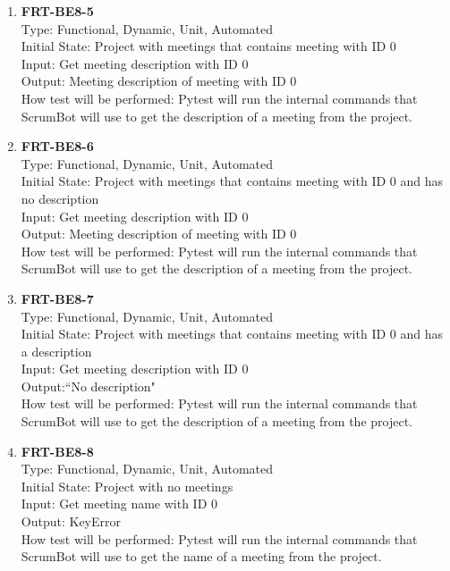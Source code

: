 \documentclass[12pt, titlepage]{article}
\begin{document}
\begin{enumerate}
    \item{\textbf{FRT-BE8-5}}\\
    Type: Functional, Dynamic, Unit, Automated\\
    Initial State: Project with meetings that contains meeting with ID 0\\
    Input: Get meeting description with ID 0\\
    Output: Meeting description of meeting with ID 0\\
    How test will be performed: Pytest will run the internal commands that ScrumBot will use to get the description of a meeting from the project.
    
    \item{\textbf{FRT-BE8-6}}\\
    Type: Functional, Dynamic, Unit, Automated\\
    Initial State: Project with meetings that contains meeting with ID 0 and has no description\\
    Input: Get meeting description with ID 0\\
    Output: Meeting description of meeting with ID 0\\
    How test will be performed: Pytest will run the internal commands that ScrumBot will use to get the description of a meeting from the project.
    
    \item{\textbf{FRT-BE8-7}}\\
    Type: Functional, Dynamic, Unit, Automated\\
    Initial State: Project with meetings that contains meeting with ID 0 and has a description\\
    Input: Get meeting description with ID 0\\
    Output:``No description"\\
    How test will be performed: Pytest will run the internal commands that ScrumBot will use to get the description of a meeting from the project.
    
    \item{\textbf{FRT-BE8-8}}\\
    Type: Functional, Dynamic, Unit, Automated\\
    Initial State: Project with no meetings\\
    Input: Get meeting name with ID 0\\
    Output: KeyError\\
    How test will be performed: Pytest will run the internal commands that ScrumBot will use to get the name of a meeting from the project.
    

\end{enumerate}
\end{document}

